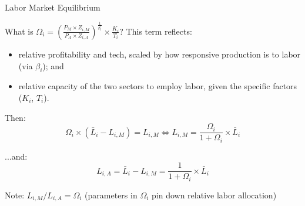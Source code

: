 \documentclass[notes,11pt, aspectratio=169, xcolor=table]{beamer}
\newenvironment{wideitemize}{\itemize\addtolength{\itemsep}{10pt}}{\enditemize}
\begin{document}
\begin{frame}{Labor Market Equilibrium}
    \begin{wideitemize}
        \item What is $\Omega_i = \left( \frac{P_{M} \times  Z_{i,M}}{P_{A} \times  Z_{i,A}} \right)^{\frac{1}{\beta_i}} \times  \frac{K_{i}}{T_{i}}$? This term reflects: 
        \begin{itemize}
            \item relative profitability and tech, scaled by how responsive production is to labor (via $\beta_i$); and
            \item relative capacity of the two sectors to employ labor, given the specific factors ($K_i$, $T_i$).
        \end{itemize}
        \item<2-> Then:
        \begin{equation*}
         \Omega_i \times (\bar{L}_i - L_{i,M}) =  L_{i,M} \iff  L_{i,M} = \frac{\Omega_i}{1+\Omega_i} \times \bar{L}_i
         \end{equation*}
         \item<3-> ...and:
        \begin{equation*}
           L_{i,A} = \bar{L}_i - L_{i,M} =  \frac{1}{1+\Omega_i}  \times  \bar{L}_i
        \end{equation*}

        \item<4-> Note: $L_{i,M} / L_{i,A} = \Omega_i$
        \qquad (parameters in $\Omega_i$ pin down relative labor allocation) 
        
    \end{wideitemize}
\end{frame}
\end{document}

